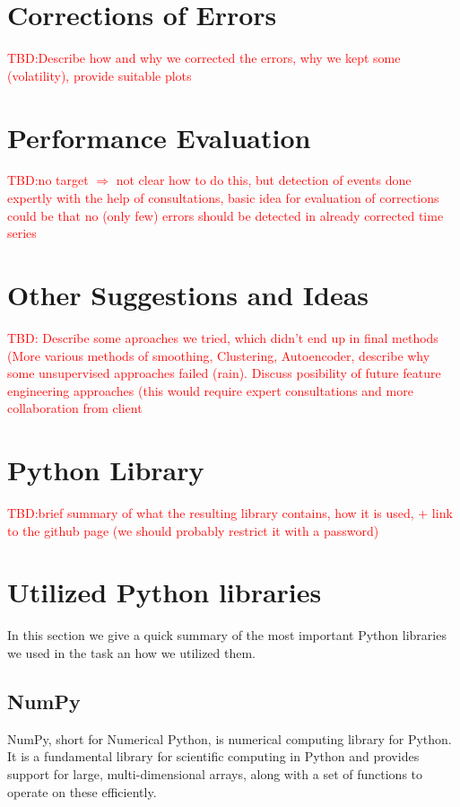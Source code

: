 \documentclass[12pt,a4paper]{article}
\begin{document}
\newpage
\section{Corrections of Errors}

\textcolor{red}{TBD:Describe how and why we corrected the errors, why we kept some (volatility), provide suitable plots}

\newpage
\section{Performance Evaluation}
\textcolor{red}{TBD:no target $\Rightarrow$ not clear how to do this, but detection of events done expertly with the help of consultations,  basic idea for evaluation of corrections could be that no (only few) errors should be detected in already corrected time series }

\newpage
\section{Other Suggestions and Ideas}
\textcolor{red}{TBD: Describe some aproaches we tried, which didn't end up in final methods (More various methods of smoothing, Clustering, Autoencoder, describe why some unsupervised approaches failed (rain). Discuss posibility of future feature engineering approaches (this would require expert consultations and more collaboration from client}


\newpage
\section{Python Library}
\textcolor{red}{TBD:brief summary of what the resulting library contains, how it is used, + link to the github page (we should probably restrict it with a password)}


\newpage
\section{Utilized Python libraries}

In this section we give a quick summary of the most important Python libraries we used in the task an how we utilized them.

\subsection{NumPy \cite{harris2020array}}
NumPy, short for Numerical Python, is numerical computing library for Python. It is a fundamental library for scientific computing in Python and provides support for large, multi-dimensional arrays, along with a set of functions to operate on these efficiently. 
\end{document}
